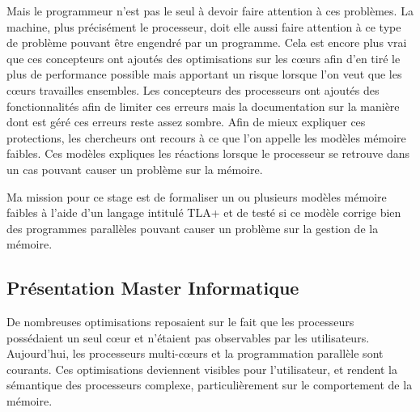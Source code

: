 \documentclass[12pt,a4paper]{article}
\begin{document}
Mais le programmeur n'est pas le seul à devoir faire attention à ces problèmes. La machine, plus précisément le processeur, doit elle aussi faire attention à ce type de problème pouvant être engendré par un programme. Cela est encore plus vrai que ces concepteurs ont ajoutés des optimisations sur les cœurs afin d'en tiré le plus de performance possible mais apportant un risque lorsque l'on veut que les cœurs travailles ensembles. Les concepteurs des processeurs ont ajoutés des fonctionnalités afin de limiter ces erreurs mais la documentation sur la manière dont est géré ces erreurs reste assez sombre.
Afin de mieux expliquer ces protections, les chercheurs ont recours à ce que l'on appelle les modèles mémoire faibles. Ces modèles expliques les réactions lorsque le processeur se retrouve dans un cas pouvant causer un problème sur la mémoire.

Ma mission pour ce stage est de formaliser un ou plusieurs modèles mémoire faibles à l'aide d'un langage intitulé TLA+ et de testé si ce modèle corrige bien des programmes parallèles pouvant causer un problème sur la gestion de la mémoire.      
  
\subsection{Présentation Master Informatique}

De nombreuses optimisations reposaient sur le fait que les processeurs possédaient un seul cœur et n'étaient pas observables par les utilisateurs.
Aujourd'hui, les processeurs multi-cœurs et la programmation parallèle sont courants. Ces optimisations deviennent visibles pour l'utilisateur, et rendent la sémantique des processeurs complexe, particulièrement sur le comportement de la mémoire.
\end{document}
